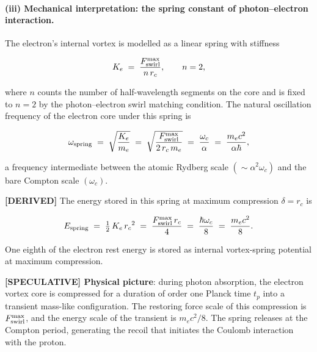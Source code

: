 \documentclass[11pt]{article}
\theoremstyle{definition}
\theoremstyle{plain}
\theoremstyle{remark}
\newcommand{\rc}{{r_c}}
\begin{document}
        \paragraph{(iii) Mechanical interpretation: the spring constant of photon--electron interaction.}

        The electron's internal vortex is modelled as a linear spring with stiffness

        \begin{align}
            K_e \;=\; \frac{F_{\rm swirl}^{\max}}{n\,\rc},
            \qquad n = 2,
            \label{eq:spring_K}
        \end{align}

        where $n$ counts the number of half-wavelength segments on the core and is fixed to $n=2$ by the photon--electron swirl matching condition. The natural oscillation frequency of the electron core under this spring is

        \begin{align}
            \omega_{\rm spring}
            \;=\; \sqrt{\frac{K_e}{m_e}}
            \;=\; \sqrt{\frac{F_{\rm swirl}^{\max}}{2\,\rc\,m_e}}
            \;=\; \frac{\omega_c}{\alpha}
            \;=\; \frac{m_e c^2}{\alpha\hbar},
            \label{eq:omega_spring}
        \end{align}

        a frequency intermediate between the atomic Rydberg scale $(\sim\alpha^2\omega_c)$ and the bare Compton scale $(\omega_c)$.

        \textbf{[DERIVED]} The energy stored in this spring at maximum compression $\delta = \rc$ is

        \begin{align}
            E_{\rm spring}
            \;=\; \tfrac{1}{2}\,K_e\,\rc^2
            \;=\; \frac{F_{\rm swirl}^{\max}\,\rc}{4}
            \;=\; \frac{\hbar\omega_c}{8}
            \;=\; \frac{m_e c^2}{8}.
            \label{eq:Espring}
        \end{align}

        One eighth of the electron rest energy is stored as internal vortex-spring potential at maximum compression.

        \textbf{[SPECULATIVE] Physical picture}: during photon absorption, the electron vortex core is compressed for a duration of order one Planck time $t_p$ into a transient mass-like configuration. The restoring force scale of this compression is $F_{\rm swirl}^{\max}$, and the energy scale of the transient is $m_e c^2/8$. The spring releases at the Compton period, generating the recoil that initiates the Coulomb interaction with the proton.
\end{document}

